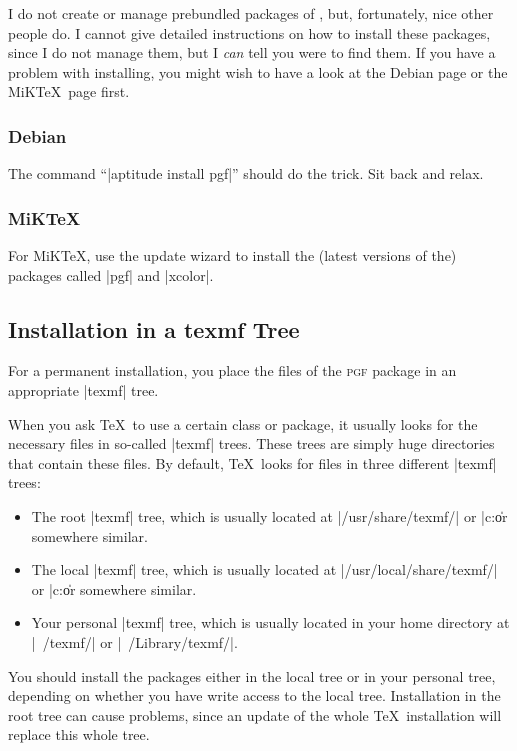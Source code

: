 I do not create or manage prebundled packages of \pgfname, but, fortunately,
nice other people do. I cannot give detailed instructions on how to install
these packages, since I do not manage them, but I \emph{can} tell you were to
find them. If you have a problem with installing, you might wish to have a look
at the Debian page or the MiK\TeX\ page first.


\subsubsection{Debian}

The command ``|aptitude install pgf|'' should do the trick. Sit back and relax.


\subsubsection{MiKTeX}

For MiK\TeX, use the update wizard to install the (latest versions of the)
packages called |pgf| and |xcolor|.


\subsection{Installation in a texmf Tree}

For a permanent installation, you place the files of the \textsc{pgf} package
in an appropriate |texmf| tree.

When you ask \TeX\ to use a certain class or package, it usually looks for the
necessary files in so-called |texmf| trees. These trees are simply huge
directories that contain these files. By default, \TeX\ looks for files in
three different |texmf| trees:
%
\begin{itemize}
    \item The root |texmf| tree, which is usually located at
        |/usr/share/texmf/| or |c:\texmf\| or somewhere similar.
    \item The local |texmf| tree, which is usually located at
        |/usr/local/share/texmf/| or |c:\localtexmf\| or somewhere similar.
    \item Your personal |texmf| tree, which is usually located in your home
        directory at |~/texmf/| or |~/Library/texmf/|.
\end{itemize}

You should install the packages either in the local tree or in your personal
tree, depending on whether you have write access to the local tree.
Installation in the root tree can cause problems, since an update of the whole
\TeX\ installation will replace this whole tree.


